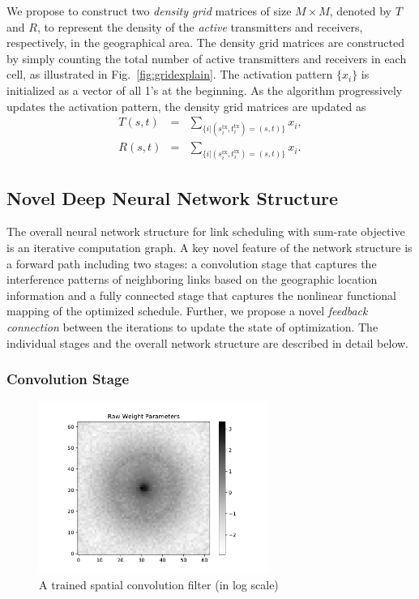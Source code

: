 \documentclass[journal,12pt,onecolumn,draftclsnofoot,]{IEEEtran}
\begin{document}
We propose to construct two \emph{density grid} matrices of size $M \times
M$, denoted by $T$ and $R$, to represent the density of the \emph{active}
transmitters and receivers, respectively, in the geographical area. The density
grid matrices are constructed by simply counting the total number of active
transmitters and receivers in each cell, as illustrated in Fig.~\ref{fig:gridexplain}.
The activation pattern $\{ x_i \}$ is initialized as a vector of all 1's at the
beginning. As the algorithm progressively updates the activation pattern, the
density grid matrices are updated as
\begin{eqnarray}
\label{eq:grid_tx}
T(s,t) & = & \sum_{\{i | (s^\text{tx}_i,t^\text{tx}_i) = (s,t) \}} x_i, \\
R(s,t) & = & \sum_{\{i | (s^\text{rx}_i,t^\text{rx}_i) = (s,t) \}} x_i.
\label{eq:grid_rx}
\end{eqnarray}


\subsection{Novel Deep Neural Network Structure}


The overall neural network structure for link scheduling with sum-rate
objective is an iterative
computation graph. A key novel feature of the network structure is a forward
path including two stages: a convolution stage that captures the interference
patterns of neighboring links based on the geographic location information and
a fully connected stage that captures the nonlinear functional mapping of the
optimized schedule. Further, we propose a novel \emph{feedback connection} between
the iterations to update the state of optimization. The individual stages and the overall network structure are described in detail
below.

\subsubsection{Convolution Stage}

\begin{figure}
        \centering
        \includegraphics[width=7.5cm]{fig/ConvFilter}
        \caption{A trained spatial convolution filter (in log scale)}
        \label{fig:convfilter}
\end{figure}
\end{document}
